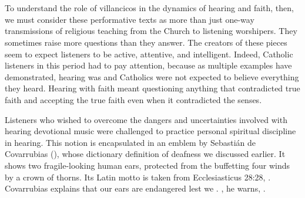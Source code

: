 \section{}

To understand the role of villancicos in the dynamics of hearing and faith,
then, we must consider these performative texts as more than just one-way
transmissions of religious teaching from the Church to listening worshipers.
They sometimes raise more questions than they answer.
The creators of these pieces seem to expect listeners to be active, attentive,
and intelligent.
Indeed, Catholic listeners in this period had to pay attention, because as
multiple examples have demonstrated, hearing was  and Catholics were not expected to believe everything they heard.
Hearing with faith meant questioning anything that contradicted true faith and
accepting the true faith even when it contradicted the senses.

Listeners who wished to overcome the dangers and uncertainties involved with
hearing devotional music were challenged to practice personal spiritual
discipline in hearing. 
This notion is encapsulated in an emblem by Sebastián de Covarrubias
(), whose dictionary definition of deafness
we discussed earlier.
It shows two fragile-looking human ears, protected from the buffetting four
winds by a crown of thorns.
Its Latin motto is taken from Ecclesiasticus 28:28, .%
    \Autocite
    [202, .]
    {Covarrubias:Emblemas}
Covarrubias explains that our ears are endangered lest we .%
    \Autocite
    [203, .]
    {Covarrubias:Emblemas}
, he warns, .%
    \Autocite
    [202, .]
    {Covarrubias:Emblemas}

